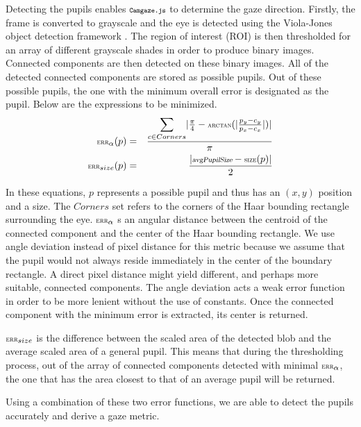 \documentclass[annual]{acmsiggraph}
\newcommand{\Acronym}[1]{\ensuremath{{\small{\texttt{#1}}}}}
\newcommand{\Name}{\Acronym{Camgaze.js}} \newcommand{\False}{\Constant{false}}
\newcommand{\Function}[1]{\ensuremath{{\small \textsc{#1}}}}
\newcommand{\Constant}[1]{\ensuremath{\small{\texttt{#1}}}}
\newcommand{\Var}[1]{\ensuremath{{\small{\textsl{#1}}}}}
\begin{document}
Detecting the pupils enables $\Name$ to determine the gaze direction. Firstly,
the frame is converted to grayscale and the eye is detected using the
Viola-Jones object detection framework \cite{Viola01}.  The region of interest
(ROI) is then thresholded for an array of different grayscale shades in order
to produce binary images.  Connected components are then detected on these
binary images.  All of the detected connected components are stored as possible
pupils.  Out of these possible pupils, the one with the minimum overall error
is designated as the pupil.  Below are the expressions to be minimized.
\begin{eqnarray} \Function{err}_{\alpha}(p) &=& \frac{ \mathlarger{\sum}_{c \in
Corners}{ \vert \frac{\pi}{4} - \Function{arctan}( \vert \frac{p_y - c_y}{p_x -
c_x} \vert) \vert } }{\pi} \\ \Function{err}_{size}(p) &=& \frac{ \vert
\Var{avgPupilSize} - \Function{size}(p) \vert }{2} \end{eqnarray}

In these equations, $p$ represents a possible pupil and thus has an $(x, y)$
position and a size. The $Corners$ set refers to the corners of the Haar
bounding rectangle surrounding the eye. $\Function{err}_{\alpha}$ s an angular
distance between the centroid of the connected component and the center of the
Haar bounding rectangle.  We use angle deviation instead of pixel distance for
this metric because we assume that the pupil would not always reside
immediately in the center of the boundary rectangle. A direct pixel distance
might yield different, and perhaps more suitable, connected components.  The
angle deviation acts a weak error function in order to be more lenient without
the use of constants.  Once the connected component with the minimum error is
extracted, its center is returned.

$\Function{err}_{size}$ is the difference between the scaled area of the
detected blob and the average scaled area of a general pupil. This means that
during the thresholding process, out of the  array of connected components
detected with minimal $\Function{err}_{\alpha}$, the one that has the area
closest to that of an average pupil will be returned.

Using a combination of these two error functions, we are able to detect the
pupils accurately and derive a gaze metric.
\end{document}

